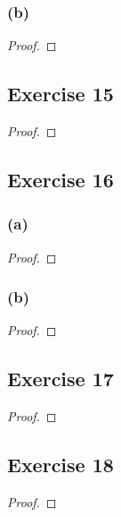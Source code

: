 \documentclass[14pt]{extarticle}
\begin{document}
\subsubsection{(b)}

\begin{proof}

\end{proof}

\subsection{Exercise 15}

\begin{proof}

\end{proof}

\subsection{Exercise 16}

\subsubsection{(a)}

\begin{proof}

\end{proof}

\subsubsection{(b)}

\begin{proof}

\end{proof}

\subsection{Exercise 17}

\begin{proof}

\end{proof}

\subsection{Exercise 18}

\begin{proof}

\end{proof}
\end{document}
